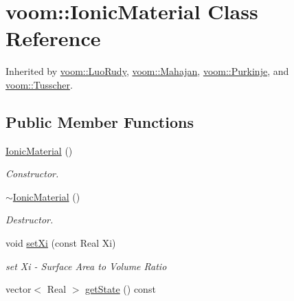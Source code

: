 \hypertarget{classvoom_1_1_ionic_material}{
\section{voom::IonicMaterial Class Reference}
\label{classvoom_1_1_ionic_material}
}


Inherited by \hyperlink{classvoom_1_1_luo_rudy}{voom::LuoRudy}, \hyperlink{classvoom_1_1_mahajan}{voom::Mahajan}, \hyperlink{classvoom_1_1_purkinje}{voom::Purkinje}, and \hyperlink{classvoom_1_1_tusscher}{voom::Tusscher}.\subsection*{Public Member Functions}
\begin{DoxyCompactItemize}
\item 
\hypertarget{classvoom_1_1_ionic_material_a00d1b9c076c6fb51ef7418251eec5388}{
\hyperlink{classvoom_1_1_ionic_material_a00d1b9c076c6fb51ef7418251eec5388}{IonicMaterial} ()}
\label{classvoom_1_1_ionic_material_a00d1b9c076c6fb51ef7418251eec5388}

\begin{DoxyCompactList}\small\item\em Constructor. \item\end{DoxyCompactList}\item 
\hypertarget{classvoom_1_1_ionic_material_a842c6d5dda37d7bd60a13e6edad7b938}{
\hyperlink{classvoom_1_1_ionic_material_a842c6d5dda37d7bd60a13e6edad7b938}{$\sim$IonicMaterial} ()}
\label{classvoom_1_1_ionic_material_a842c6d5dda37d7bd60a13e6edad7b938}

\begin{DoxyCompactList}\small\item\em Destructor. \item\end{DoxyCompactList}\item 
\hypertarget{classvoom_1_1_ionic_material_ad66c9371c9409f79c2ff3db14158140a}{
void \hyperlink{classvoom_1_1_ionic_material_ad66c9371c9409f79c2ff3db14158140a}{setXi} (const Real Xi)}
\label{classvoom_1_1_ionic_material_ad66c9371c9409f79c2ff3db14158140a}

\begin{DoxyCompactList}\small\item\em set Xi -\/ Surface Area to Volume Ratio \item\end{DoxyCompactList}\item 
\hypertarget{classvoom_1_1_ionic_material_aacccab910cf6533cb8d0e6d614d0e6c2}{
vector$<$ Real $>$ \hyperlink{classvoom_1_1_ionic_material_aacccab910cf6533cb8d0e6d614d0e6c2}{getState} () const }
\label{classvoom_1_1_ionic_material_aacccab910cf6533cb8d0e6d614d0e6c2}


\end{DoxyCompactItemize}
